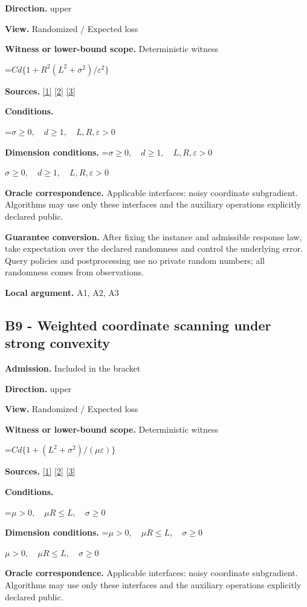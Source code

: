 \documentclass[10pt,a4paper]{article}
\newcommand{\AtlasMath}[1]{\par\begingroup\centering\setbox0=\hbox{$\displaystyle #1$}\ifdim\wd0>1.4\linewidth\typeout{ATLAS WIDE FORMULA: \the\wd0}\fi\ifdim\wd0>\linewidth\resizebox{\linewidth}{!}{\box0}\else\box0\fi\par\endgroup}
\newcommand{\AtlasInlineMath}[1]{\begingroup\setbox0=\hbox{$#1$}\ifdim\wd0>.4\linewidth\endgroup\AtlasMath{#1}\else\endgroup$#1$\fi}
\begin{document}
\textbf{Direction.} upper

\textbf{View.} Randomized / Expected loss

\textbf{Witness or lower-bound scope.} Deterministic witness

\AtlasMath{Cd\{1+R^2(L^2+\sigma^2)/\varepsilon^2\}}
\textbf{Sources.} \href{https://arxiv.org/pdf/1405.4980}{[1]} \href{https://www2.isye.gatech.edu/~nemirovs/MOR_AccuracyCertificates.pdf}{[2]} \href{https://arxiv.org/pdf/2609.20701}{[3]}

\textbf{Conditions.} 
\AtlasMath{\sigma\ge0,\quad d\ge1,\quad L,R,\varepsilon>0}


\textbf{Dimension conditions.} \AtlasInlineMath{\sigma\ge0,\quad d\ge1,\quad L,R,\varepsilon>0}

\textbf{Oracle correspondence.} Applicable interfaces: noisy coordinate subgradient. Algorithms may use only these interfaces and the auxiliary operations explicitly declared public.

\textbf{Guarantee conversion.} After fixing the instance and admissible response law, take expectation over the declared randomness and control the underlying error. Query policies and postprocessing use no private random numbers; all randomness comes from observations.

\textbf{Local argument.} A1, A2, A3

\subsection{B9 - Weighted coordinate scanning under strong convexity}
\textbf{Admission.} Included in the bracket

\textbf{Direction.} upper

\textbf{View.} Randomized / Expected loss

\textbf{Witness or lower-bound scope.} Deterministic witness

\AtlasMath{Cd\{1+(L^2+\sigma^2)/(\mu\varepsilon)\}}
\textbf{Sources.} \href{https://arxiv.org/pdf/1405.4980}{[1]} \href{https://www2.isye.gatech.edu/~nemirovs/MOR_AccuracyCertificates.pdf}{[2]} \href{https://arxiv.org/pdf/2609.20701}{[3]}

\textbf{Conditions.} 
\AtlasMath{\mu>0,\quad\mu R\le L,\quad\sigma\ge0}


\textbf{Dimension conditions.} \AtlasInlineMath{\mu>0,\quad\mu R\le L,\quad\sigma\ge0}

\textbf{Oracle correspondence.} Applicable interfaces: noisy coordinate subgradient. Algorithms may use only these interfaces and the auxiliary operations explicitly declared public.
\end{document}
